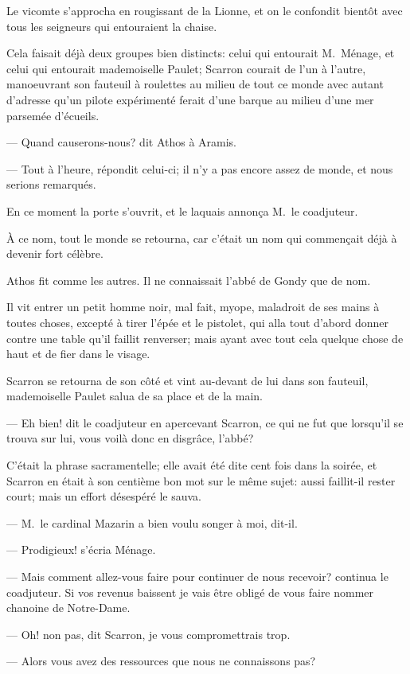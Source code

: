 Le vicomte s'approcha en rougissant de la Lionne, et on le confondit bientôt avec tous les seigneurs qui entouraient la chaise.

Cela faisait déjà deux groupes bien distincts: celui qui entourait M.~Ménage, et celui qui entourait mademoiselle Paulet; Scarron courait de l'un à l'autre, manoeuvrant son fauteuil à roulettes au milieu de tout ce monde avec autant d'adresse qu'un pilote expérimenté ferait d'une barque au milieu d'une mer parsemée d'écueils.

— Quand causerons-nous? dit Athos à Aramis.

— Tout à l'heure, répondit celui-ci; il n'y a pas encore assez de monde, et nous serions remarqués.

En ce moment la porte s'ouvrit, et le laquais annonça M.~le coadjuteur.

À ce nom, tout le monde se retourna, car c'était un nom qui commençait déjà à devenir fort célèbre.

Athos fit comme les autres. Il ne connaissait l'abbé de Gondy que de nom.

Il vit entrer un petit homme noir, mal fait, myope, maladroit de ses mains à toutes choses, excepté à tirer l'épée et le pistolet, qui alla tout d'abord donner contre une table qu'il faillit renverser; mais ayant avec tout cela quelque chose de haut et de fier dans le visage.

Scarron se retourna de son côté et vint au-devant de lui dans son fauteuil, mademoiselle Paulet salua de sa place et de la main.

— Eh bien! dit le coadjuteur en apercevant Scarron, ce qui ne fut que lorsqu'il se trouva sur lui, vous voilà donc en disgrâce, l'abbé?

C'était la phrase sacramentelle; elle avait été dite cent fois dans la soirée, et Scarron en était à son centième bon mot sur le même sujet: aussi faillit-il rester court; mais un effort désespéré le sauva.

— M.~le cardinal Mazarin a bien voulu songer à moi, dit-il.

— Prodigieux! s'écria Ménage.

— Mais comment allez-vous faire pour continuer de nous recevoir? continua le coadjuteur. Si vos revenus baissent je vais être obligé de vous faire nommer chanoine de Notre-Dame.

— Oh! non pas, dit Scarron, je vous compromettrais trop.

— Alors vous avez des ressources que nous ne connaissons pas?

